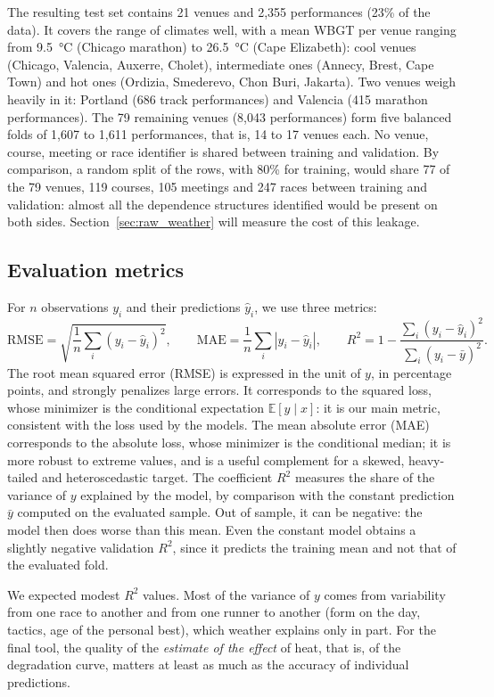 \documentclass[11pt,a4paper]{article}
\newcommand{\E}{\mathbb{E}}
\begin{document}
The resulting test set contains 21 venues and 2,355 performances (23\% of the data). It covers the range of climates
well, with a mean WBGT per venue ranging from 9.5~°C (Chicago marathon) to 26.5~°C (Cape Elizabeth): cool venues
(Chicago, Valencia, Auxerre, Cholet), intermediate ones (Annecy, Brest, Cape Town) and hot ones (Ordizia, Smederevo,
Chon Buri, Jakarta). Two venues weigh heavily in it: Portland (686 track performances) and Valencia (415 marathon
performances). The 79 remaining venues (8,043 performances) form five balanced folds of 1,607 to 1,611 performances,
that is, 14 to 17 venues each. No venue, course, meeting or race identifier is shared between training and validation.
By comparison, a random split of the rows, with 80\% for training, would share 77 of the 79 venues, 119 courses, 105
meetings and 247 races between training and validation: almost all the dependence structures identified would be
present on both sides. Section~\ref{sec:raw_weather} will measure the cost of this leakage.

\subsection{Evaluation metrics}\label{sec:metrics}

For $n$ observations $y_i$ and their predictions $\hat y_i$, we use three metrics:
\[
\mathrm{RMSE} = \sqrt{\frac1n\sum_i (y_i - \hat y_i)^2},\qquad
\mathrm{MAE} = \frac1n\sum_i |y_i - \hat y_i|,\qquad
R^2 = 1 - \frac{\sum_i (y_i - \hat y_i)^2}{\sum_i (y_i - \bar y)^2}.
\]
The root mean squared error (RMSE) is expressed in the unit of $y$, in percentage points, and strongly penalizes large
errors. It corresponds to the squared loss, whose minimizer is the conditional expectation $\E[y \mid x]$: it is our
main metric, consistent with the loss used by the models. The mean absolute error (MAE) corresponds to the absolute
loss, whose minimizer is the conditional median; it is more robust to extreme values, and is a useful complement for
a skewed, heavy-tailed and heteroscedastic target. The coefficient $R^2$ measures the share of the variance of $y$
explained by the model, by comparison with the constant prediction $\bar y$ computed on the evaluated sample. Out of
sample, it can be negative: the model then does worse than this mean. Even the constant model obtains a slightly
negative validation $R^2$, since it predicts the training mean and not that of the evaluated fold.

We expected modest $R^2$ values. Most of the variance of $y$ comes from variability from one race to another and from
one runner to another (form on the day, tactics, age of the personal best), which weather explains only in part. For
the final tool, the quality of the \emph{estimate of the effect} of heat, that is, of the degradation curve, matters
at least as much as the accuracy of individual predictions.
\end{document}

